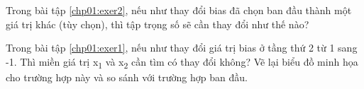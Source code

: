 \begin{exer}
Trong bài tập \ref{chp01:exer2}, nếu như thay đổi  bias đã chọn ban đầu thành một giá trị khác (tùy chọn), thì tập trọng số sẽ cần thay đổi như thế nào?
\end{exer}

\begin{exer}
Trong bài tập \ref{chp01:exer1}, nếu như thay đổi giá trị bias ở tầng thứ 2 từ 1 sang -1. Thì miền giá trị x\textsubscript{1} và x\textsubscript{2} cần tìm có thay đổi không? Vẽ lại biểu đồ minh họa cho trường hợp này và so sánh với trường hợp ban đầu.
\end{exer}